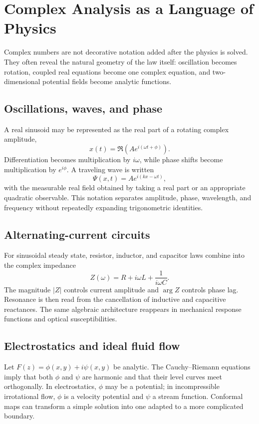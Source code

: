 \section{Complex Analysis as a Language of Physics}
\label{sec:ch5-physics-applications}

Complex numbers are not decorative notation added after the physics is solved. They often reveal the natural geometry of the law itself: oscillation becomes rotation, coupled real equations become one complex equation, and two-dimensional potential fields become analytic functions.

\subsection{Oscillations, waves, and phase}
A real sinusoid may be represented as the real part of a rotating complex amplitude,
\[
x(t)=\Re\!\left(Ae^{i(\omega t+\phi)}\right).
\]
Differentiation becomes multiplication by $i\omega$, while phase shifts become multiplication by $e^{i\phi}$. A traveling wave is written
\[
\Psi(x,t)=A e^{i(kx-\omega t)},
\]
with the measurable real field obtained by taking a real part or an appropriate quadratic observable. This notation separates amplitude, phase, wavelength, and frequency without repeatedly expanding trigonometric identities.

\subsection{Alternating-current circuits}
For sinusoidal steady state, resistor, inductor, and capacitor laws combine into the complex impedance
\[
Z(\omega)=R+i\omega L+\frac{1}{i\omega C}.
\]
The magnitude $|Z|$ controls current amplitude and $\arg Z$ controls phase lag. Resonance is then read from the cancellation of inductive and capacitive reactances. The same algebraic architecture reappears in mechanical response functions and optical susceptibilities.

\subsection{Electrostatics and ideal fluid flow}
Let $F(z)=\phi(x,y)+i\psi(x,y)$ be analytic. The Cauchy--Riemann equations imply that both $\phi$ and $\psi$ are harmonic and that their level curves meet orthogonally. In electrostatics, $\phi$ may be a potential; in incompressible irrotational flow, $\phi$ is a velocity potential and $\psi$ a stream function. Conformal maps can transform a simple solution into one adapted to a more complicated boundary.


